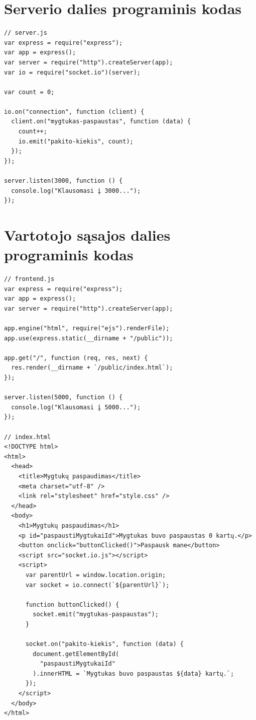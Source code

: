 \documentclass{VUMIFPSkursinis}
\begin{document}
\section{Serverio dalies programinis kodas}
\label{priedas1}
\begin{verbatim}
// server.js
var express = require("express");
var app = express();
var server = require("http").createServer(app);
var io = require("socket.io")(server);

var count = 0;

io.on("connection", function (client) {
  client.on("mygtukas-paspaustas", function (data) {
    count++;
    io.emit("pakito-kiekis", count);
  });
});

server.listen(3000, function () {
  console.log("Klausomasi į 3000...");
});
\end{verbatim}


\section{Vartotojo sąsajos dalies programinis kodas}
\label{priedas2}
\begin{verbatim}
// frontend.js
var express = require("express");
var app = express();
var server = require("http").createServer(app);

app.engine("html", require("ejs").renderFile);
app.use(express.static(__dirname + "/public"));

app.get("/", function (req, res, next) {
  res.render(__dirname + `/public/index.html`);
});

server.listen(5000, function () {
  console.log("Klausomasi į 5000...");
});

// index.html
<!DOCTYPE html>
<html>
  <head>
    <title>Mygtukų paspaudimas</title>
    <meta charset="utf-8" />
    <link rel="stylesheet" href="style.css" />
  </head>
  <body>
    <h1>Mygtukų paspaudimas</h1>
    <p id="paspaustiMygtukaiId">Mygtukas buvo paspaustas 0 kartų.</p>
    <button onclick="buttonClicked()">Paspausk mane</button>
    <script src="socket.io.js"></script>
    <script>
      var parentUrl = window.location.origin;
      var socket = io.connect(`${parentUrl}`);

      function buttonClicked() {
        socket.emit("mygtukas-paspaustas");
      }

      socket.on("pakito-kiekis", function (data) {
        document.getElementById(
          "paspaustiMygtukaiId"
        ).innerHTML = `Mygtukas buvo paspaustas ${data} kartų.`;
      });
    </script>
  </body>
</html>
\end{verbatim}
\end{document}
